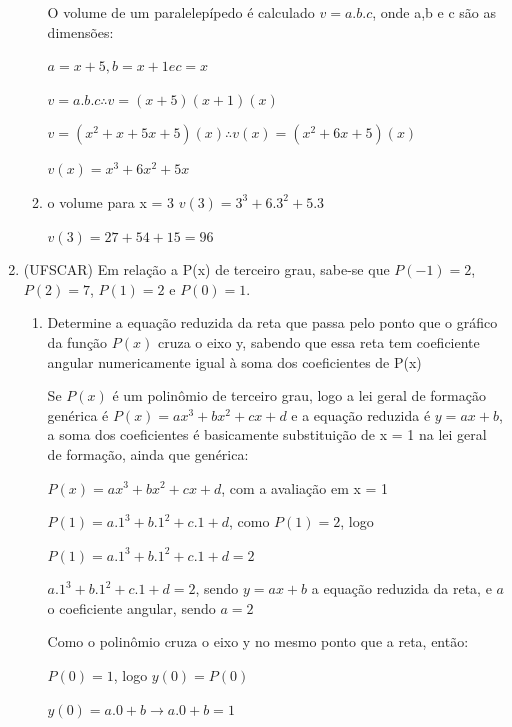 \begin{multicols*}{2}
\begin{enumerate}
\begin{enumerate}
                        O volume de um paralelepípedo é calculado $v = a.b.c$, onde a,b e c são as 								dimensões:

                        $a = x+5, b = x+1 e c = x$

                        $v = a.b.c \therefore v = (x+5)(x+1)(x)$

                        $v = (x^2 + x + 5x +5)(x) \therefore v(x) = (x^2 +6x +5)(x)$

                        $v(x) = x^3 + 6x^2 + 5x$
                  \item o volume para x = 3
                        $v(3) = 3^3 + 6.3^2 + 5.3$

                        $v(3) = 27 + 54 + 15 = 96$
              \end{enumerate}
        \item (UFSCAR) Em relação a P(x) de terceiro grau, sabe-se que $P(-1) = 2$, $P(2) = 7$,
              $P(1) = 2$ e	$P(0) = 1$.

              \begin{enumerate}

                  \item Determine a equação reduzida da reta que passa pelo ponto que o gráfico da função $P(x)$ 			cruza o eixo y, sabendo que essa reta tem coeficiente angular numericamente igual à soma dos 			coeficientes de P(x)

                        Se $P(x)$ é um polinômio de terceiro grau, logo a lei geral de formação genérica é
                        $P(x) = ax^3 + bx^2 + cx +d$ e a equação reduzida é $y = ax +b$, a soma dos coeficientes é 				basicamente substituição de x = 1 na lei geral de formação, ainda que genérica:

                        $P(x) = ax^3 + bx^2 + cx +d$, com a avaliação em x = 1

                        $P(1) = a.1^3 + b.1^2 + c.1 +d$, como $P(1) =  2$, logo

                        $P(1) = a.1^3 + b.1^2 + c.1 +d = 2$

                        $a.1^3 + b.1^2 + c.1 +d = 2$, sendo $y = ax +b$ a equação reduzida da reta, e $a$ o coeficiente 		angular, sendo $a = 2$

                        Como o polinômio cruza o eixo y no mesmo ponto que a reta, então:

                        $P(0) = 1$, logo $y(0) = P(0)$

                        $y(0) = a.0+b \rightarrow a.0 +b = 1$


\end{enumerate}
\end{enumerate}
\end{multicols*}
